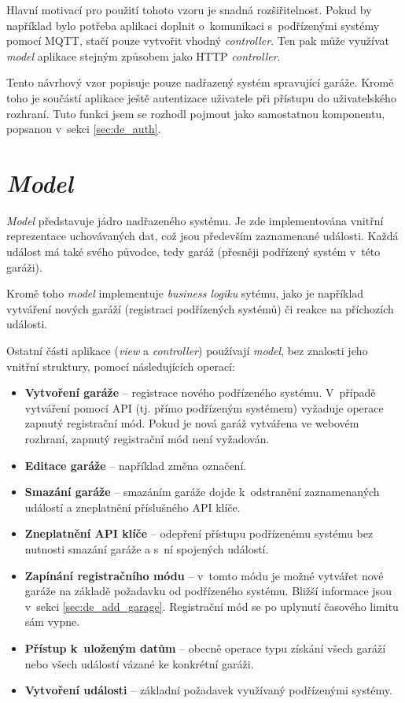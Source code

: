 Hlavní motivací pro použití tohoto vzoru je snadná rozšiřitelnost. Pokud by například bylo potřeba aplikaci doplnit o~komunikaci s~podřízenými systémy pomocí MQTT, stačí pouze vytvořit vhodný \textit{controller}. Ten pak může využívat \textit{model} aplikace stejným způsobem jako HTTP \textit{controller}.

Tento návrhový vzor popisuje pouze nadřazený systém spravující garáže. Kromě toho je součástí aplikace ještě autentizace uživatele při přístupu do uživatelského rozhraní. Tuto funkci jsem se rozhodl pojmout jako samostatnou komponentu, popsanou v~sekci \ref{sec:de_auth}.

\section{\textit{Model}}
\label{sec:de_model}

\textit{Model} představuje jádro nadřazeného systému. Je zde implementována vnitřní reprezentace uchovávaných dat, což jsou především zaznamenané události. Každá událost má také svého původce, tedy garáž (přesněji podřízený systém v~této garáži).

Kromě toho \textit{model} implementuje \textit{business logiku} sytému, jako je například vytváření nových garáží (registraci podřízených systémů) či reakce na příchozích události.

Ostatní části aplikace (\textit{view} a \textit{controller}) používají \textit{model}, bez znalosti jeho vnitřní struktury, pomocí následujících operací:

\begin{itemize}
    \item \textbf{Vytvoření garáže} -- registrace nového podřízeného systému. V~případě vytváření pomocí API (tj. přímo podřízeným systémem) vyžaduje operace zapnutý registrační mód. Pokud je nová garáž vytvářena ve webovém rozhraní, zapnutý registrační mód není vyžadován.
    \item \textbf{Editace garáže} -- například změna označení.
    \item \textbf{Smazání garáže} -- smazáním garáže dojde k~odstranění zaznamenaných událostí a zneplatnění příslušného API klíče.
    \item \textbf{Zneplatnění API klíče} -- odepření přístupu podřízenému systému bez nutnosti smazání garáže a s~ní spojených událostí.
    \item \textbf{Zapínání registračního módu} -- v~tomto módu je možné vytvářet nové garáže na základě požadavku od podřízeného systému. Bližší informace jsou v~sekci \ref{sec:de_add_garage}. Registrační mód se po uplynutí časového limitu sám vypne.
    \item \textbf{Přístup k~uloženým datům} -- obecně operace typu získání všech garáží nebo všech událostí vázané ke konkrétní garáži.
    \item \textbf{Vytvoření události} -- základní požadavek využívaný podřízenými systémy.
\end{itemize}

